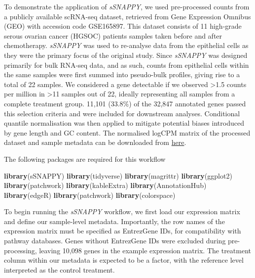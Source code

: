 \documentclass[9pt,a4paper,]{extarticle}
\newenvironment{Shaded}{\begin{snugshade}}{\end{snugshade}}
\newcommand{\FunctionTok}[1]{\textcolor[rgb]{0.13,0.29,0.53}{\textbf{#1}}}
\newcommand{\NormalTok}[1]{#1}
\begin{document}
To demonstrate the application of \emph{sSNAPPY}, we used pre-processed counts from a publicly available scRNA-seq dataset, retrieved from Gene Expression Omnibus (GEO) with accession code GSE165897.
This dataset consists of 11 high-grade serous ovarian cancer (HGSOC) patients samples taken before and after chemotherapy\citep{Zhang2022}.
\emph{sSNAPPY} was used to re-analyse data from the epithelial cells as they were the primary focus of the original study.
Since \emph{sSNAPPY} was designed primarily for bulk RNA-seq data, and as such, counts from epithelial cells within the same samples were first summed into pseudo-bulk profiles, giving rise to a total of 22 samples.
We considered a gene detectable if we observed \textgreater1.5 counts per million in \textgreater11 samples out of 22, ideally representing all samples from a complete treatment group.
11,101 (33.8\%) of the 32,847 annotated genes passed this selection criteria and were included for downstream analyses.
Conditional quantile normalisation\citep{Hansen2012} was then applied to mitigate potential biases introduced by gene length and GC content.
The normalised logCPM matrix of the processed dataset and sample metadata can be downloaded from \href{https://github.com/Wenjun-Liu/F1000_sSNAPPY_manuscript/tree/master/data}{here}.

The following packages are required for this workflow

\begin{Shaded}
\begin{Highlighting}[]
\FunctionTok{library}\NormalTok{(sSNAPPY)}
\FunctionTok{library}\NormalTok{(tidyverse)}
\FunctionTok{library}\NormalTok{(magrittr)}
\FunctionTok{library}\NormalTok{(ggplot2)}
\FunctionTok{library}\NormalTok{(patchwork)}
\FunctionTok{library}\NormalTok{(kableExtra)}
\FunctionTok{library}\NormalTok{(AnnotationHub) }
\FunctionTok{library}\NormalTok{(edgeR)}
\FunctionTok{library}\NormalTok{(patchwork)}
\FunctionTok{library}\NormalTok{(colorspace)}
\end{Highlighting}
\end{Shaded}

To begin running the \emph{sSNAPPY} workflow, we first load our expression matrix and define our sample-level metadata.
Importantly, the row names of the expression matrix must be specified as EntrezGene IDs, for compatibility with pathway databases.
Genes without EntrezGene IDs were excluded during pre-processing, leaving 10,098 genes in the example expression matrix.
The treatment column within our metadata is expected to be a factor, with the reference level interpreted as the control treatment.
\end{document}
